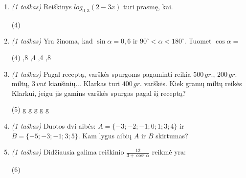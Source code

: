 \documentclass[a4paper]{article}
\begin{document}
\begin{enumerate}
      \item \textit{(1 taškas)} Reiškinys $log_{0,3}(2-3x)$ turi prasmę, kai.
            \begin{tasks}[item-format={\normalfont}, after-item-skip=2mm,
                        label=\Alph*, label-format={\bfseries}](4)
            \end{tasks}
      \item \textit{(1 taškas)} Yra žinoma, kad $\sin\alpha=0,6$ ir
            $90^\circ<\alpha<180^\circ$. Tuomet $\cos\alpha=$
            \begin{tasks}[item-format={\normalfont}, after-item-skip=2mm,
                        label=\Alph*, label-format={\bfseries}](4)
                  ,8
                  ,4
                  ,4
                  ,8
            \end{tasks}
      \item \textit{(1 taškas)} Pagal receptą, varškės spurgoms pagaminti
            reikia $500\,gr.$, $200\,gr.$ miltų, $3\,vnt$ kiaušinių... Klarkas
            turi $400\,gr.$
            varškės. Kiek gramų miltų reikės Klarkui, jeigu jis gamins varškės
            spurgas pagal šį receptą?
            \begin{tasks}[item-format={\normalfont}, after-item-skip=2mm,
                        label=\Alph*, label-format={\bfseries}](5)
                   g
                   g
                   g
                   g
                   g
            \end{tasks}
      \item \textit{(1 taškas)} Duotos dvi aibės: $A=\{-3;-2;-1;0;1;3;4\}$ ir
            $B=\{-5;-3;-1;3;5\}$. Kam lygus aibių $A$ ir $B$ skirtumas?
            \vspace{7mm}

      \item \textit{(1 taškas)} Didžiausia galima reiškinio
            $\frac{12}{3+\cos^2\alpha}$ reikmė yra:
            \begin{tasks}[item-format={\normalfont}, after-item-skip=2mm,
                        label=\Alph*, label-format={\bfseries}](6)
            \end{tasks}


\end{enumerate}
\end{document}
